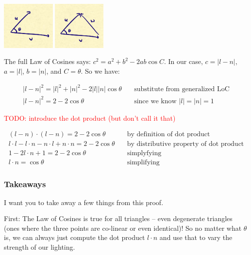 \documentclass{article}
\newcommand\todo[1]{\textcolor{red}{TODO: #1}}
\begin{document}
\begin{center}
	\includegraphics[width=0.2\textwidth,frame]{assets/uv.jpg}
	\hspace{0.2\textwidth}
	\includegraphics[width=0.197\textwidth,frame]{assets/uvw.jpg}
\end{center}

The full Law of Cosines says: $c^2 = a^2 + b^2 - 2ab \cos C$.
In our case, $c = | l - n |$, $a = |l|$, $b = |n|$, and $C = \theta$.
So we have:

\begin{align*}
|l-n|^2 = |l|^2 + |n|^2 - 2 |l| |n| \cos \theta & \quad \text{substitute from generalized LoC} \\
|l-n|^2 = 2 - 2 \cos \theta & \quad \text{since we know } |l| = |n| = 1
\end{align*}

\todo{introduce the dot product (but don't call it that)}

\begin{align*}
(l - n) \cdot (l - n) = 2 - 2 \cos \theta & \quad \text{by definition of dot product} \\
l \cdot l - l \cdot n - n \cdot l + n \cdot n = 2 - 2 \cos \theta & \quad \text{by distributive property of dot product} \\
1 - 2 l \cdot n + 1 = 2 - 2 \cos \theta & \quad \text{simplyfying} \\
l \cdot n = \cos \theta & \quad \text{simplifying}
\end{align*}

\subsubsection{Takeaways}

I want you to take away a few things from this proof.

First: The Law of Cosines is true for all triangles -- even degenerate triangles (ones where the three points are co-linear or even identical)!
So no matter what $\theta$ is, we can always just compute the dot product $l \cdot n$ and use that to vary the strength of our lighting.
\end{document}

